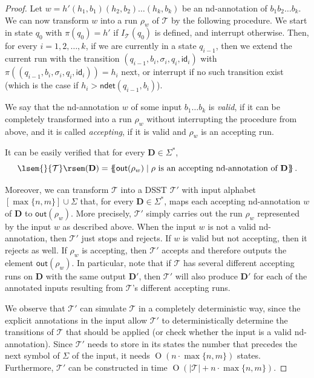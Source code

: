 \documentclass[
a4paper
]{article}
\theoremstyle{plain}
\theoremstyle{definition}
\theoremstyle{remark}
\newcommand{\doc}{\ensuremath{\mathbf{D}}}
\newcommand{\ndetbf}[1]{\textsf{ndet}(#1)}
\newcommand{\sst}{\mathcal{T}}
\newcommand{\out}{\operatorname{out}}
\newcommand{\sem}[1]{{\lsem{}{#1}\rsem}}
\newcommand{\multiset}[1]{\{\!\!\{#1\}\!\!\}}
\renewcommand{\operatorname}[1]{\textsf{#1}}
\DeclareMathOperator{\bigo}{O}
\begin{document}
\begin{proof}
Let $w = h' (h_1, b_1) (h_2, b_2) \ldots (h_k, b_k)$ be an nd-annotation of $b_1 b_2 \ldots b_k$. We can now transform $w$ into a run $\rho_w$ of $\sst$ by the following procedure. We start in state $q_0$ with $\pi(q_0) = h'$ if $I_{\sst}(q_0)$ is defined, and interrupt otherwise. Then, for every $i = 1, 2, \ldots, k$, if we are currently in a state $q_{i-1}$, then we extend the current run with the transition $(q_{i-1}, b_i, \sigma_i, q_i, \textsf{id}_i)$ with $\pi((q_{i-1}, b_i, \sigma_i, q_i, \textsf{id}_i)) = h_i$ next, or interrupt if no such transition exist (which is the case if $h_i > \ndetbf{q_{i-1}, b_i}$). 

We say that the nd-annotation $w$ of some input $b_1 \ldots b_k$ is \emph{valid}, if it can be completely transformed into a run $\rho_w$ without interrupting the procedure from above, and it is called \emph{accepting}, if it is valid and $\rho_w$ is an accepting run. 

It can be easily verified that for every $\doc \in \Sigma^*$, 
\begin{equation*}
\sem{\sst}(\doc) = \multiset{\out(\rho_w) \mid \text{$\rho$ is an accepting nd-annotation of $\doc$}}\,.
\end{equation*}

Moreover, we can transform $\sst$ into a DSST $\sst'$ with input alphabet $[\max\{n, m\}] \cup \Sigma$ that, for every $\doc \in \Sigma^*$, maps each accepting nd-annotation $w$ of $\doc$ to $\out(\rho_w)$. More precisely, $\sst'$ simply carries out the run $\rho_w$ represented by the input $w$ as described above. When the input $w$ is not a valid nd-annotation, then $\sst'$ just stops and rejects. If $w$ is valid but not accepting, then it rejects as well. If $\rho_w$ is accepting, then $\sst'$ accepts and therefore outputs the element $\out(\rho_w)$. In particular, note that if $\sst$ has several different accepting runs on $\doc$ with the same output $\doc'$, then $\sst'$ will also produce $\doc'$ for each of the annotated inputs resulting from $\sst$'s different accepting runs. 

We observe that $\sst'$ can simulate $\sst$ in a completely deterministic way, since the explicit annotations in the input allow $\sst'$ to deterministically determine the transitions of $\sst$ that should be applied (or check whether the input is a valid nd-annotation). Since $\sst'$ needs to store in its states the number that precedes the next symbol of $\Sigma$ of the input, it needs $\bigo(n \cdot \max\{n, m\})$ states. Furthermore, $\sst'$ can be constructed in time $\bigo(|\sst| + n \cdot \max\{n, m\})$.


\end{proof}
\end{document}
